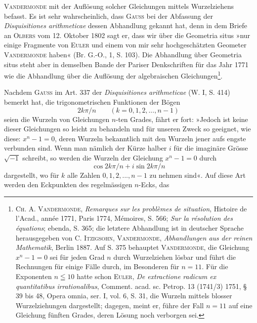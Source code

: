 \textsc{Vandermonde} mit der Auflösung solcher Gleichungen mittels Wurzelziehens
befasst. Es ist sehr wahrscheinlich, dass \textsc{Gauss} bei der Abfassung der \textit{Disquisitiones
arithmeticae} dessen Abhandlung gekannt hat, denn in dem Briefe an
\textsc{Olbers} vom 12. Oktober 1802 sagt er, dass wir über die Geometria situs »nur
einige Fragmente von \textsc{Euler} und einem von mir sehr hochgeschätzten Geometer
\textsc{Vandermonde} haben« (Br. G.-O., 1, S. 103). Die Abhandlung über
Geometria situs steht aber in demselben Bande der Pariser Denkschriften für
das Jahr 1771 wie die Abhandlung über die Auflösung der algebraischen
Gleichungen\footnote{\textsc{Ch. A. Vandermonde}, \textit{Remarques sur les problèmes de situation}, Histoire de l’Acad., année 1771, Paris 1774, Mémoires, S. 566; \textit{Sur la résolution des équations}; ebenda, S. 365; die letztere Abhandlung ist in deutscher Sprache herausgegeben von C. \textsc{Itzigsohn}, \textsc{Vandermonde}, \textit{Abhandlungen aus der reinen Mathematik}, Berlin 1887. Auf S. 375 behauptet \textsc{Vandermonde}, die Gleichung \(x^n-1=0\) sei für jeden Grad \(n\) durch Wurzelziehen lösbar und führt die Rechnungen für einige Fälle durch, im Besonderen für \(n=11\). Für die Exponenten \(n\leqq10\) hatte schon \textsc{Euler}, \textit{De extractione radicum ex quantitatibus irrationalibus}, Comment. acad. sc. Petrop. 13 (1741/3) 1751, § 39 bis 48, Opera omnia, ser. I, vol. 6, S. 31, die Wurzeln mittels blosser Wurzelziehungen dargestellt; dagegen, meint er, führe der Fall \(n=11\) auf eine Gleichung fünften Grades, deren Lösung noch verborgen sei.}.
\par
Nachdem \textsc{Gauss} im Art. 337 der \textit{Disquisitiones arithmeticae} (W. I, S. 414)
bemerkt hat, die trigonometrischen Funktionen der Bögen
\[
2k\pi/n\qquad(k=0,1,2,\mathord{.}\mathord{.}\mathord{.},n-1)
\]
\noindent seien die Wurzeln von Gleichungen \(n\)-ten Grades, fährt er fort: »Jedoch ist
keine dieser Gleichungen so leicht zu behandeln und für unseren Zweck so
geeignet, wie diese: \(x^n-1=0\), deren Wurzeln bekanntlich mit den Wurzeln
jener aufs engste verbunden sind. Wenn man nämlich der Kürze halber \(i\)
für die imaginäre Grösse \(\surd{-1}\) schreibt, so werden die Wurzeln der Gleichung
\(x^n-1=0\) durch
\[
\cos 2k\pi/n+i\sin 2k\pi/n
\]
\noindent dargestellt, wo für \(k\) alle Zahlen \(0,1,2,\mathord{.}\mathord{.}\mathord{.},n-1\) zu nehmen sind«.
\clearpage{}\setcounter{footnote}{0}
\noindent\hspace*{\parindent}Auf diese Art werden den Eckpunkten des regelmässigen \(n\)-Ecks, das
